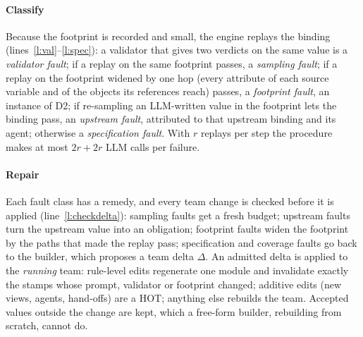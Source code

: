 \documentclass[10pt,conference]{IEEEtran}
\theoremstyle{definition}
\newcommand{\D}[1]{\textsf{D#1}}
\begin{document}
\paragraph*{Classify} Because the footprint is recorded and small, the engine
replays the binding (lines~\ref{l:val}--\ref{l:spec}): a validator that gives
two verdicts on the same value is a \emph{validator fault}; if a replay on
the same footprint passes, a \emph{sampling fault}; if a replay on the
footprint widened by one hop (every attribute of each source variable and of
the objects its references reach) passes, a \emph{footprint fault}, an
instance of \D2; if re-sampling an LLM-written value in the footprint lets the
binding pass, an \emph{upstream fault}, attributed to that upstream binding
and its agent; otherwise a \emph{specification fault}. With $r$ replays per
step the procedure makes at most $2r+2r$ LLM calls per failure.

\paragraph*{Repair} Each fault class has a remedy, and every team change is
checked before it is applied (line~\ref{l:checkdelta}): sampling faults get a
fresh budget; upstream faults turn the upstream value into an obligation;
footprint faults widen the footprint by the paths that made the replay pass;
specification and coverage faults go back to the builder, which proposes a
team delta $\Delta$. An admitted delta is applied to the \emph{running} team:
rule-level edits regenerate one module and invalidate exactly the stamps whose
prompt, validator or footprint changed; additive edits (new views, agents,
hand-offs) are a HOT; anything else rebuilds the team. Accepted values outside
the change are kept, which a free-form builder, rebuilding from scratch,
cannot do.
\end{document}
